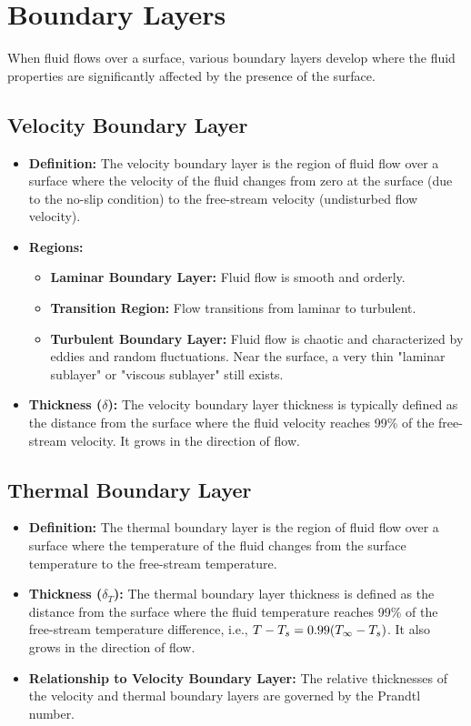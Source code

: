 \section{Boundary Layers}
When fluid flows over a surface, various boundary layers develop where the fluid properties are significantly affected by the presence of the surface.

\subsection{Velocity Boundary Layer}
\begin{itemize}
    \item \textbf{Definition:} The velocity boundary layer is the region of fluid flow over a surface where the velocity of the fluid changes from zero at the surface (due to the no-slip condition) to the free-stream velocity (undisturbed flow velocity).
    \item \textbf{Regions:}
        \begin{itemize}
            \item \textbf{Laminar Boundary Layer:} Fluid flow is smooth and orderly.
            \item \textbf{Transition Region:} Flow transitions from laminar to turbulent.
            \item \textbf{Turbulent Boundary Layer:} Fluid flow is chaotic and characterized by eddies and random fluctuations. Near the surface, a very thin "laminar sublayer" or "viscous sublayer" still exists.
        \end{itemize}
    \item \textbf{Thickness ($\delta$):} The velocity boundary layer thickness is typically defined as the distance from the surface where the fluid velocity reaches 99\% of the free-stream velocity. It grows in the direction of flow.
\end{itemize}

\subsection{Thermal Boundary Layer}
\begin{itemize}
    \item \textbf{Definition:} The thermal boundary layer is the region of fluid flow over a surface where the temperature of the fluid changes from the surface temperature to the free-stream temperature.
    \item \textbf{Thickness ($\delta_T$):} The thermal boundary layer thickness is defined as the distance from the surface where the fluid temperature reaches 99\% of the free-stream temperature difference, i.e., $T - T_s = 0.99(T_{\infty} - T_s)$. It also grows in the direction of flow.
    \item \textbf{Relationship to Velocity Boundary Layer:} The relative thicknesses of the velocity and thermal boundary layers are governed by the Prandtl number.
\end{itemize}

